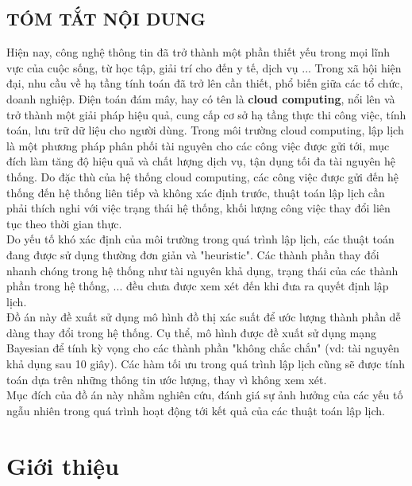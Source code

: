 \documentclass{my_style}
\begin{document}
\section*{TÓM TẮT NỘI DUNG}
Hiện nay, công nghệ thông tin đã trở thành một phần thiết yếu trong mọi lĩnh vực của cuộc sống, từ học tập, giải trí cho đến y tế, dịch vụ ... Trong xã hội hiện đại, nhu cầu về hạ tầng tính toán đã trở lên cần thiết, phổ biến giữa các tổ chức, doanh nghiệp. Điện toán đám mây, hay có tên là \textbf{cloud computing}, nổi lên và trở thành một giải pháp hiệu quả, cung cấp cơ sở hạ tầng thực thi công việc, tính toán, lưu trữ dữ liệu cho người dùng. Trong môi trường cloud computing, lập lịch là một phương pháp phân phối tài nguyên cho các công việc được gửi tới, mục đích làm tăng độ hiệu quả và chất lượng dịch vụ, tận dụng tối đa tài nguyên hệ thống. Do đặc thù của hệ thống cloud computing, các công việc được gửi đến hệ thống đến hệ thống liên tiếp và không xác định trước, thuật toán lập lịch cần phải thích nghi với việc trạng thái hệ thống, khối lượng công việc thay đổi liên tục theo thời gian thực. \\
Do yếu tố khó xác định của môi trường trong quá trình lập lịch, các thuật toán đang được sử dụng thường đơn giản và "heuristic". Các thành phần thay đổi nhanh chóng trong hệ thống như tài nguyên khả dụng, trạng thái của các thành phần trong hệ thống, ... đều chưa được xem xét đến khi đưa ra quyết định lập lịch. \\
Đồ án này đề xuất sử dụng mô hình đồ thị xác suất để ước lượng thành phần dễ dàng thay đổi trong hệ thống. Cụ thể, mô hình được đề xuất sử dụng mạng Bayesian để tính kỳ vọng cho các thành phần "không chắc chắn" (vd: tài nguyên khả dụng sau 10 giây). Các hàm tối ưu trong quá trình lập lịch cũng sẽ được tính toán dựa trên những thông tin ước lượng, thay vì không xem xét. \\
Mục đích của đồ án này nhằm nghiên cứu, đánh giá sự ảnh hưởng của các yếu tố ngẫu nhiên trong quá trình hoạt động tới kết quả của các thuật toán lập lịch. 

	
\newpage
\tableofcontents	
\listoffigures
\listoftables	
\newpage
	
\chapter{Giới thiệu}
\label{Introduction}
\end{document}
